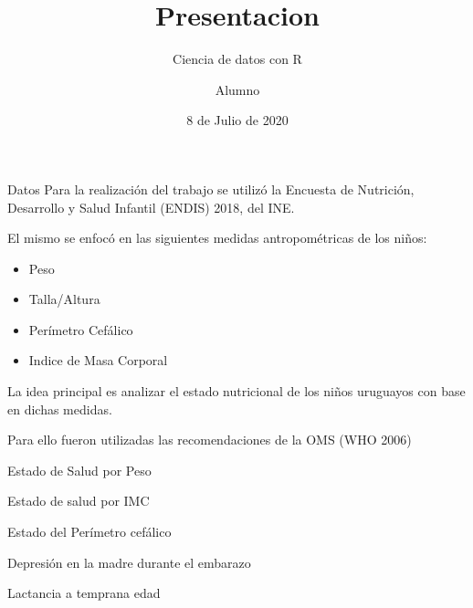 \documentclass[
  9pt,
  ignorenonframetext,
]{beamer}
\title{Presentacion}
\subtitle{Ciencia de datos con R}
\author{Alumno}
\date{8 de Julio de 2020}
\begin{document}
\frame{\titlepage}

\begin{frame}{Datos}
\protect\hypertarget{datos}{}
Para la realización del trabajo se utilizó la Encuesta de Nutrición,
Desarrollo y Salud Infantil (ENDIS) 2018, del INE.

\pause

El mismo se enfocó en las siguientes medidas antropométricas de los
niños:

\begin{itemize}

  \item{Peso}
  
  \item{Talla/Altura}
  
  \item{Perímetro Cefálico}
  
  \item{Indice de Masa Corporal}
  
\end{itemize}

\pause

La idea principal es analizar el estado nutricional de los niños
uruguayos con base en dichas medidas.

\pause

Para ello fueron utilizadas las recomendaciones de la OMS (WHO 2006)
\end{frame}

\begin{frame}{Estado de Salud por Peso}
\protect\hypertarget{estado-de-salud-por-peso}{}
\end{frame}

\begin{frame}{Estado de salud por IMC}
\protect\hypertarget{estado-de-salud-por-imc}{}
\end{frame}

\begin{frame}{Estado del Perímetro cefálico}
\protect\hypertarget{estado-del-peruxedmetro-cefuxe1lico}{}
\end{frame}

\begin{frame}{Depresión en la madre durante el embarazo}
\protect\hypertarget{depresiuxf3n-en-la-madre-durante-el-embarazo}{}
\end{frame}

\begin{frame}{Lactancia a temprana edad}
\protect\hypertarget{lactancia-a-temprana-edad}{}
\end{frame}
\end{document}
